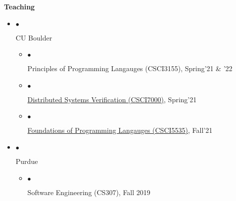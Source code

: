 \documentclass[10pt]{article}
\makeatletter
\newcommand{\lbar}[1]{{\color{#1}\ding{118}}\hspace*{2pt}}
\newcommand{\service}[1]{\item $\bullet$ \hspace{1ex}\parbox{7.2in}{#1}}
\newenvironment{talk}[4]
{ \item
  \begin{tabular*}{7.5in}{l@{\extracolsep{\fill}}r}
    \textbf{#1} & \textit{#2} \\
    \hspace{1ex} #3 & \small{#4}
\end{tabular*}
} {}
\newenvironment{itemregion}[1]{
  \vspace*{0.5ex}
  {{\textbf{\large{#1}}}}
  \begin{itemize}\itemsep1pt}
  {\end{itemize}\vspace{0.8ex}}
\makeatother
\begin{document}
\begin{itemregion}{\lbar{Mahogany}Teaching}
  \service{CU Boulder}
  \begin{itemize}
    \service{Principles of Programming Langauges (CSCI3155), Spring'21 \& '22}
    \service{\href{https://gowthamk.github.io/csci7000_s21/}{Distributed Systems Verification (CSCI7000)}, Spring'21}
    \service{\href{https://csci5535.github.io/}{Foundations of
    Programming Langauges (CSCI5535)}, Fall'21}
  \end{itemize}
  \service{Purdue}
  \begin{itemize}
    \service{Software Engineering (CS307), Fall 2019}
  \end{itemize}
\end{itemregion}





\end{document}

